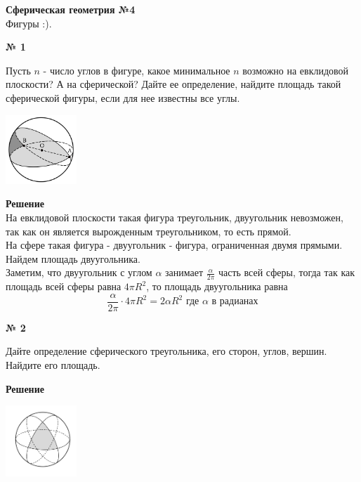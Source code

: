 


    \begin{center}
        \textbf{Сферическая геометрия №4}\\
        Фигуры :).
    \end{center}


    \begin{center}
        \textbf{№ 1}
    \end{center}
    Пусть $n$ - число углов в фигуре, какое минимальное $n$ возможно на евклидовой плоскости?
    А на сферической?
    Дайте ее определение, найдите площадь такой сферической фигуры, если для нее известны все углы.

    \begin{center}
        \includegraphics[width=0.2\textwidth]{images/Frame 52}\\
    \end{center}
    \textbf{Решение}\\
    На евклидовой плоскости такая фигура треугольник,
    двуугольник невозможен, так как он является вырожденным треугольником, то есть прямой.\\

    На сфере такая фигура - двуугольник - фигура, ограниченная двумя прямыми.\\

    Найдем площадь двуугольника.\\
    Заметим, что двуугольник с углом $\alpha$ занимает $\frac{\alpha}{2\pi}$ часть всей сферы,
    тогда так как площадь всей сферы равна $4\pi R^2$, то площадь двуугольника равна
    \[
        \frac{\alpha}{2\pi}\cdot 4\pi R^2 = 2\alpha R^2\text{ где $\alpha$ в радианах}
    \]

    \begin{center}
        \textbf{№ 2}
    \end{center}
    Дайте определение сферического треугольника, его сторон, углов, вершин.
    Найдите его площадь.

    \textbf{Решение}\\
    \begin{center}
        \includegraphics[width=0.2\textwidth]{images/Frame 23}\\
    \end{center}

